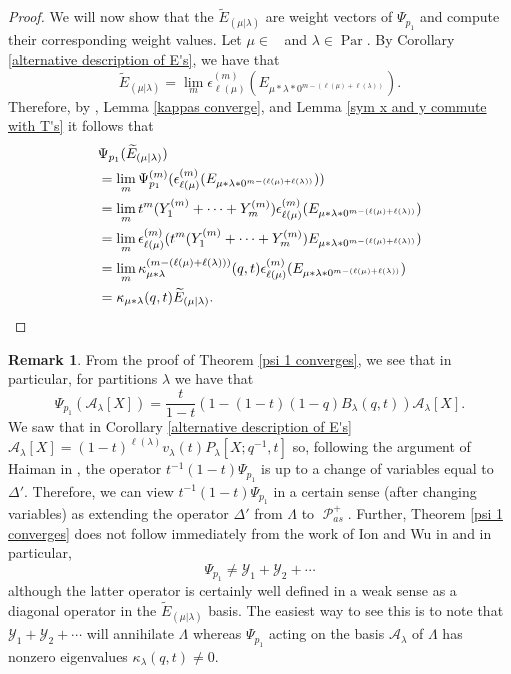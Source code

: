 \documentclass[11pt]{article}
\theoremstyle{definition}
\newtheorem{rema}[theo]{Remark}
\numberwithin{equation}{section}
\newcommand{\y}{{ \mathscr{Y} }}
\DeclareMathOperator{\sP}{\mathscr{P} }
\DeclareMathOperator{\Par}{\mathrm{Par}}
\DeclareMathOperator{\Compred}{\mathrm{Comp}^{\textit{red}}}
\begin{document}
\begin{proof}
We will now show that the $\widetilde{E}_{(\mu|\lambda)}$ are weight vectors of $\Psi_{p_1}$ and compute their corresponding weight values. Let $\mu \in \Compred$ and $\lambda \in \Par$. By Corollary \ref{alternative description of E's}, we have that 
$$ \widetilde{E}_{(\mu|\lambda)} = \lim_{m} \epsilon_{\ell(\mu)}^{(m)}(E_{\mu*\lambda*0^{m-(\ell(\mu)+\ell(\lambda))}}). $$
Therefore, by \cite[Proposition 6.21]{Ion_2022}, Lemma \ref{kappas converge}, and Lemma \ref{sym x and y commute with T's} it follows that 
\begin{align*}
   & \Psi_{p_1}(\widetilde{E}_{(\mu|\lambda)})\\
   &= \lim_{m} \Psi_{p_1}^{(m)}(\epsilon_{\ell(\mu)}^{(m)}(E_{\mu*\lambda*0^{m-(\ell(\mu)+\ell(\lambda))}}))\\
   &= \lim_{m} t^m(Y_1^{(m)}+\cdots+Y_m^{(m)})\epsilon_{\ell(\mu)}^{(m)}(E_{\mu*\lambda*0^{m-(\ell(\mu)+\ell(\lambda))}})\\
   &= \lim_{m} \epsilon_{\ell(\mu)}^{(m)}( t^m(Y_1^{(m)}+\cdots+Y_m^{(m)})E_{\mu*\lambda*0^{m-(\ell(\mu)+\ell(\lambda))}} )\\
   &= \lim_{m} \kappa_{\mu*\lambda}^{(m-(\ell(\mu)+\ell(\lambda)))}(q,t)\epsilon_{\ell(\mu)}^{(m)}(E_{\mu*\lambda*0^{m-(\ell(\mu)+\ell(\lambda))}})\\
   &= \kappa_{\mu*\lambda}(q,t)\widetilde{E}_{(\mu|\lambda)}. \qedhere
\end{align*} 
\end{proof}

\begin{rema}\label{remark about delta'}
From the proof of Theorem \ref{psi 1 converges}, we see that in particular, for partitions $\lambda$ we have that 
$$\Psi_{p_1}(\mathcal{A}_{\lambda}[X]) = \frac{t}{1-t}(1-(1-t)(1-q)B_{\lambda}(q,t))\mathcal{A}_{\lambda}[X] .$$ We saw that in Corollary \ref{alternative description of E's} $\mathcal{A}_{\lambda}[X] = (1-t)^{\ell(\lambda)}v_{\lambda}(t)P_{\lambda}[X;q^{-1},t]$ so,  following the argument of Haiman in \cite[Definition after Corollary 2.3]{HMacDG}, the operator $t^{-1}(1-t)\Psi_{p_1}$ is up to a change of variables equal to $\Delta'$. Therefore, we can view $t^{-1}(1-t)\Psi_{p_1}$ in a certain sense (after changing variables) as extending the operator $\Delta'$ from $\Lambda$ to $\sP_{as}^{+}$. Further, Theorem \ref{psi 1 converges} does not follow immediately from the work of Ion and Wu in \cite{Ion_2022} and in particular, 
$$ \Psi_{p_1} \neq \y_1+\y_2+ \cdots$$
although the latter operator is certainly well defined in a weak sense as a diagonal operator in the $\widetilde{E}_{(\mu|\lambda)}$ basis. The easiest way to see this is to note that $\y_1+\y_2+ \cdots$ will annihilate $\Lambda$ whereas $\Psi_{p_1}$ acting on the basis $\mathcal{A}_{\lambda}$ of $\Lambda$ has nonzero eigenvalues $\kappa_{\lambda}(q,t) \neq 0$.
\end{rema}
\end{document}
